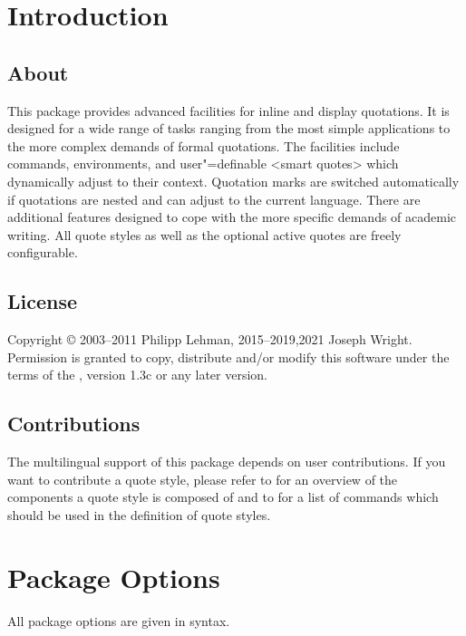 \documentclass{ltxdockit}[2010/09/26]
\begin{document}
\printtitlepage
\tableofcontents
\listoftables

\section{Introduction}
\label{int}

\subsection[About]{About }

This package provides advanced facilities for inline and display quotations. It is designed for a wide range of tasks ranging from the most simple applications to the more complex demands of formal quotations. The facilities include commands, environments, and user"=definable <smart quotes> which dynamically adjust to their context. Quotation marks are switched automatically if quotations are nested and can adjust to the current language. There are additional features designed to cope with the more specific demands of academic writing. All quote styles as well as the optional active quotes are freely configurable.

\subsection{License}

Copyright © 2003--2011 Philipp Lehman, 2015--2019,2021 Joseph Wright. Permission is granted to copy, distribute and\slash or modify this software under the terms of the \lppl, version 1.3c or any later version.

\subsection{Contributions}

The multilingual support of this package depends on user contributions. If you want to contribute a quote style, please refer to  for an overview of the components a quote style is composed of and to  for a list of commands which should be used in the definition of quote styles.

\section{Package Options}
\label{opt}

All package options are given in \keyval syntax.
\end{document}
